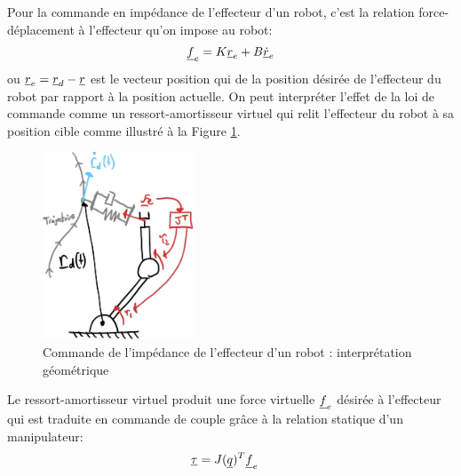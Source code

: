 Pour la commande en impédance de l'effecteur d'un robot, c'est la relation force-déplacement à l'effecteur qu'on impose au robot:
\begin{align}
\underline{f}_e  =  K \underline{r}_e + B \underline{\dot{r}}_e 
\end{align}
ou $\underline{r}_e = \underline{r}_d - \underline{r} $ est le vecteur position qui de la position désirée de l'effecteur du robot par rapport à la position actuelle. On peut interpréter l'effet de la loi de commande comme un ressort-amortisseur virtuel qui relit l'effecteur du robot à sa position cible comme illustré à la Figure \ref{fig:impedanceeffectorgeo}.
\begin{figure}[h]
	\centering
		\includegraphics[width=0.4\textwidth]{fig/impedancecontroleffectorgeo.jpg}
	\caption{Commande de l'impédance de l'effecteur d'un robot : interprétation géométrique}
	\label{fig:impedanceeffectorgeo}
\end{figure}
Le ressort-amortisseur virtuel produit une force virtuelle $\underline{f}_e$ désirée à l'effecteur qui est traduite en commande de couple grâce à la relation statique d'un manipulateur:
\begin{align}
\underline{\tau} &= J(\underline{q})^T \underline{f}_e
\end{align}


